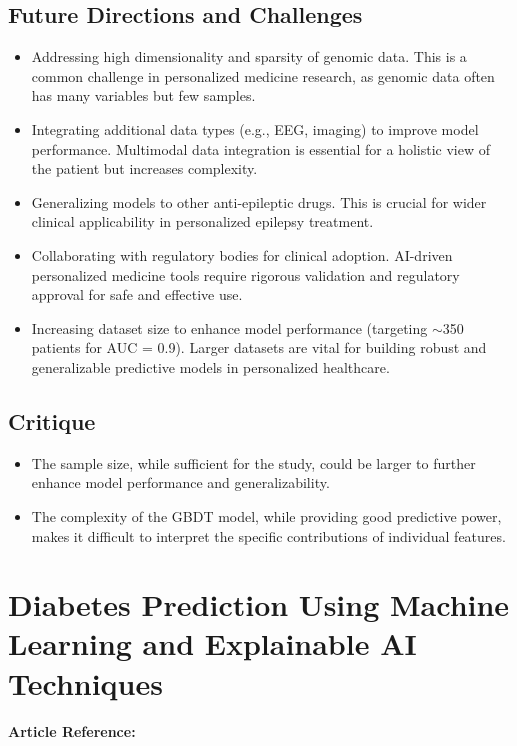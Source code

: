 \subsection*{Future Directions and Challenges}
\begin{itemize}
    \item Addressing high dimensionality and sparsity of genomic data. This is a common challenge in personalized medicine research, as genomic data often has many variables but few samples.
    \item Integrating additional data types (e.g., EEG, imaging) to improve model performance. Multimodal data integration is essential for a holistic view of the patient but increases complexity.
    \item Generalizing models to other anti-epileptic drugs. This is crucial for wider clinical applicability in personalized epilepsy treatment.
    \item Collaborating with regulatory bodies for clinical adoption. AI-driven personalized medicine tools require rigorous validation and regulatory approval for safe and effective use.
    \item Increasing dataset size to enhance model performance (targeting $\sim$350 patients for AUC = 0.9). Larger datasets are vital for building robust and generalizable predictive models in personalized healthcare.
\end{itemize}

\subsection*{Critique}
\begin{itemize}
    \item The sample size, while sufficient for the study, could be larger to further enhance model performance and generalizability. 
    \item The complexity of the GBDT model, while providing good predictive power, makes it difficult to interpret the specific contributions of individual features.
    
\end{itemize}

\section{Diabetes Prediction Using Machine Learning and Explainable AI Techniques}
\textbf{Article Reference:} \cite{article_2}

